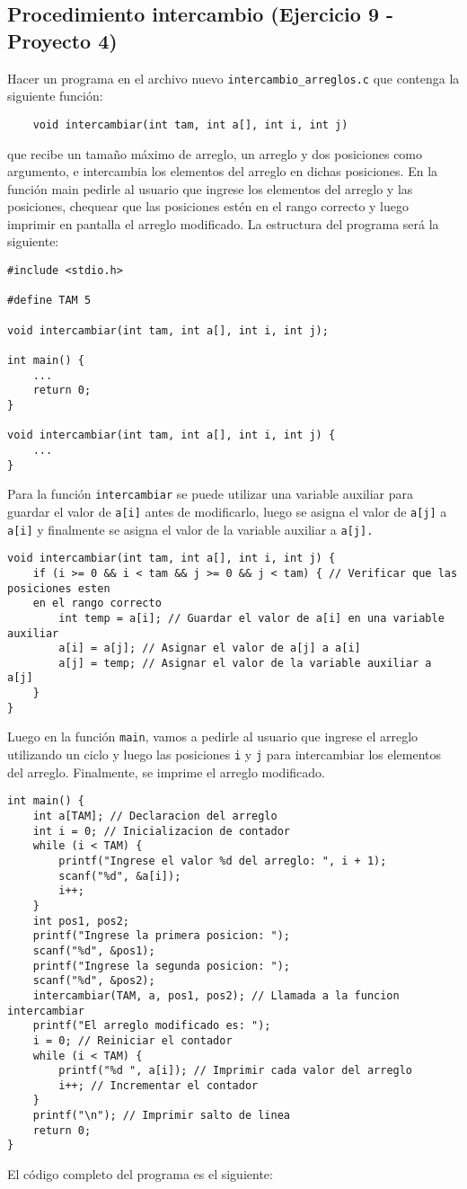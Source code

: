 \documentclass{article}
\begin{document}
\subsection{Procedimiento intercambio (Ejercicio 9 - Proyecto 4)}
Hacer un programa en el archivo nuevo \texttt{intercambio\_arreglos.c} que contenga la siguiente función:
\begin{verbatim}
    void intercambiar(int tam, int a[], int i, int j)
\end{verbatim}
que recibe un tamaño máximo de arreglo, un arreglo y dos posiciones como argumento, e intercambia los elementos del arreglo en dichas posiciones. En la función main pedirle al usuario que ingrese los elementos del arreglo y las posiciones, chequear que las posiciones estén en el rango correcto y luego imprimir en pantalla el arreglo modificado.
La estructura del programa será la siguiente:
\begin{verbatim}
#include <stdio.h>

#define TAM 5

void intercambiar(int tam, int a[], int i, int j);

int main() {
    ...
    return 0;
}

void intercambiar(int tam, int a[], int i, int j) {
    ...
}

\end{verbatim}
Para la función \texttt{intercambiar} se puede utilizar una variable auxiliar para guardar el valor de \texttt{a[i]} antes de modificarlo, luego se asigna el valor de \texttt{a[j]} a \texttt{a[i]} y finalmente se asigna el valor de la variable auxiliar a \texttt{a[j].}

\begin{verbatim}
void intercambiar(int tam, int a[], int i, int j) {
    if (i >= 0 && i < tam && j >= 0 && j < tam) { // Verificar que las posiciones esten 
    en el rango correcto
        int temp = a[i]; // Guardar el valor de a[i] en una variable auxiliar
        a[i] = a[j]; // Asignar el valor de a[j] a a[i]
        a[j] = temp; // Asignar el valor de la variable auxiliar a a[j]
    }
}
\end{verbatim}
Luego en la función \texttt{main}, vamos a pedirle al usuario que ingrese el arreglo utilizando un ciclo y luego las posiciones \texttt{i} y \texttt{j} para intercambiar los elementos del arreglo. Finalmente, se imprime el arreglo modificado.
\newpage
\begin{verbatim}
int main() {
    int a[TAM]; // Declaracion del arreglo
    int i = 0; // Inicializacion de contador
    while (i < TAM) {
        printf("Ingrese el valor %d del arreglo: ", i + 1);
        scanf("%d", &a[i]);
        i++;
    }
    int pos1, pos2;
    printf("Ingrese la primera posicion: ");
    scanf("%d", &pos1);
    printf("Ingrese la segunda posicion: ");
    scanf("%d", &pos2);
    intercambiar(TAM, a, pos1, pos2); // Llamada a la funcion intercambiar
    printf("El arreglo modificado es: ");
    i = 0; // Reiniciar el contador
    while (i < TAM) {
        printf("%d ", a[i]); // Imprimir cada valor del arreglo
        i++; // Incrementar el contador
    }
    printf("\n"); // Imprimir salto de linea
    return 0;
}
\end{verbatim}
El código completo del programa es el siguiente:
\end{document}
